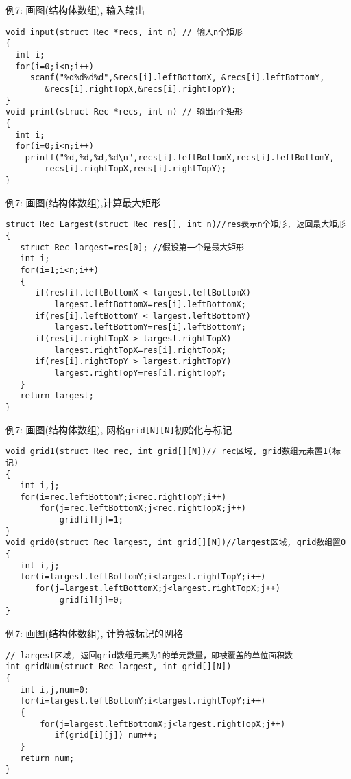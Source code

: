 \begin{frame}{例7: 画图(结构体数组), 输入输出}
\vspace{-0.3cm}
\begin{lstlisting}
void input(struct Rec *recs, int n) // 输入n个矩形
{
  int i;
  for(i=0;i<n;i++) 
     scanf("%d%d%d%d",&recs[i].leftBottomX, &recs[i].leftBottomY,
     	&recs[i].rightTopX,&recs[i].rightTopY);
}
void print(struct Rec *recs, int n) // 输出n个矩形
{
  int i;
  for(i=0;i<n;i++) 
    printf("%d,%d,%d,%d\n",recs[i].leftBottomX,recs[i].leftBottomY,
    	recs[i].rightTopX,recs[i].rightTopY);
} 
\end{lstlisting}
\medskip
\end{frame}

\begin{frame}{例7: 画图(结构体数组),计算最大矩形}
\vspace{-0.3cm}
\begin{lstlisting}
struct Rec Largest(struct Rec res[], int n)//res表示n个矩形, 返回最大矩形
{
   struct Rec largest=res[0]; //假设第一个是最大矩形 
   int i;
   for(i=1;i<n;i++)
   {
      if(res[i].leftBottomX < largest.leftBottomX)
          largest.leftBottomX=res[i].leftBottomX;
      if(res[i].leftBottomY < largest.leftBottomY)
          largest.leftBottomY=res[i].leftBottomY;
      if(res[i].rightTopX > largest.rightTopX) 
          largest.rightTopX=res[i].rightTopX;
      if(res[i].rightTopY > largest.rightTopY) 
          largest.rightTopY=res[i].rightTopY;
   }
   return largest; 
} 
\end{lstlisting}
\end{frame}

\begin{frame}{例7: 画图(结构体数组), 网格\lstinline$grid[N][N]$初始化与标记}
\vspace{-0.3cm}
\begin{lstlisting}
void grid1(struct Rec rec, int grid[][N])// rec区域, grid数组元素置1(标记) 
{
   int i,j;
   for(i=rec.leftBottomY;i<rec.rightTopY;i++)
       for(j=rec.leftBottomX;j<rec.rightTopX;j++)
           grid[i][j]=1;
}
void grid0(struct Rec largest, int grid[][N])//largest区域, grid数组置0 
{
   int i,j;
   for(i=largest.leftBottomY;i<largest.rightTopY;i++)
      for(j=largest.leftBottomX;j<largest.rightTopX;j++)
           grid[i][j]=0;
}
\end{lstlisting}
\end{frame}

\begin{frame}{例7: 画图(结构体数组), 计算被标记的网格}
\begin{lstlisting}
// largest区域, 返回grid数组元素为1的单元数量，即被覆盖的单位面积数 
int gridNum(struct Rec largest, int grid[][N])
{
   int i,j,num=0;
   for(i=largest.leftBottomY;i<largest.rightTopY;i++)
   {
       for(j=largest.leftBottomX;j<largest.rightTopX;j++)
          if(grid[i][j]) num++;
   } 
   return num;
}
\end{lstlisting}
\end{frame}

